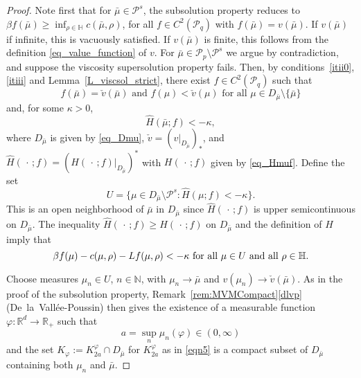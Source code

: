\documentclass{article}
\theoremstyle{definition}
\numberwithin{equation}{section}
\numberwithin{theorem}{section}
\newcommand{\R}{\mathbb{R}}
\newcommand{\Hb}{\mathbb{H}}
\newcommand{\Nb}{\mathbb{N}}
\newcommand{\Pcal}{{\mathcal P}}
\newcommand{\fdot}{{\,\cdot\,}}
\begin{document}
\begin{proof}

Note first that for $\bar\mu\in\Pcal^s$, the subsolution property reduces to $\beta f(\bar\mu)\ge\inf_{\rho\in \mathbb H}  c(\bar\mu,\rho)$, for all $f\in C^2(\Pcal_q)$ with $f(\bar\mu) = v(\bar\mu)$. If $v(\bar \mu)$ if infinite, this is vacuously satisfied. If $v(\bar \mu)$ is finite, this follows from the definition \eqref{eq_value_function} of $v$. For $\bar\mu\in\Pcal_p\setminus\Pcal^s$ we argue by contradiction, and suppose the viscosity supersolution property fails. Then, by conditions~\ref{itii0}, \ref{itiii} and Lemma~\ref{L_viscsol_strict}, there exist $f\in C^2(\Pcal_q)$ such that
\[
\text{$f(\bar\mu) = \check v(\bar\mu)$ and $f(\mu) < \check v(\mu)$ for all $\mu\in D_{\bar\mu}\setminus\{\bar\mu\}$}
\]
and, for some $\kappa>0$,
\[
\hat H(\bar\mu; f) < -\kappa,
\]
where $D_{\bar\mu}$ is given by \eqref{eq_Dmu}, $\check v = (v|_{D_{\bar\mu}})_*$, and $\hat H(\fdot; f) = (H(\fdot;f)|_{D_{\bar\mu}})^*$ with $H(\fdot;f)$ given by \eqref{eq_Hmuf}. Define the set
\[
U = \{\mu\in D_{\bar\mu}\setminus\Pcal^s\colon \hat H(\mu; f) < -\kappa \}.
\]
This is an open neighborhood of $\bar\mu$ in $D_{\bar\mu}$ since $\hat H(\fdot; f)$ is upper semicontinuous on $D_{\bar\mu}$. The inequality $\hat H(\fdot; f)\ge H(\fdot;f)$ on $D_{\bar\mu}$ and the definition of $H$ imply that
\begin{equation}\label{eq_supersol_bound1}
\text{$ \beta f(\mu)-c(\mu,\rho) - Lf(\mu,\rho) < -\kappa$ for all $\mu\in U$ and all $\rho\in\Hb$.}
\end{equation}

Choose measures $\mu_n\in U$, $n\in\Nb$, with $\mu_n\to\bar\mu$ and $v(\mu_n)\to \check v(\bar\mu)$. As in the proof of the subsolution property, 
  Remark~\ref{rem:MVMCompact}\ref{dlvp} (De~la~Vall\'ee-Poussin) then
 gives the existence of a  measurable function $\varphi:\R^d\to\R_+$ such that
$$
a = \sup_n \mu_n(\varphi) \in (0,\infty)
$$
 and the set
$
K_\varphi:=K^\varphi_{2a} \cap D_{\bar\mu}
$
for $K^\varphi_{2a}$ as in \eqref{eqn5}  is a compact subset of $D_{\bar\mu}$ containing both $\mu_n$ and $\bar\mu$.




%




\end{proof}
\end{document}
